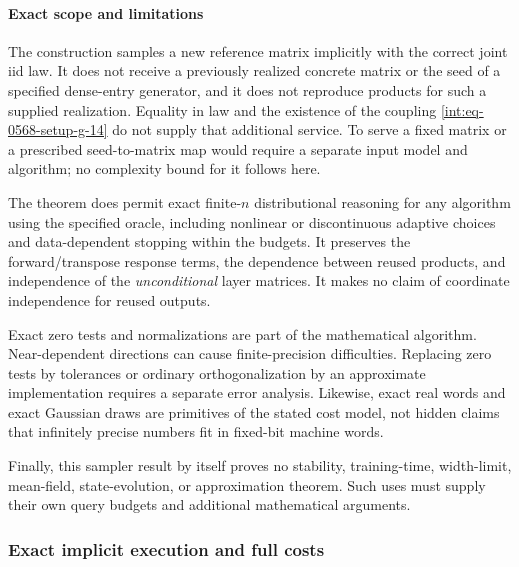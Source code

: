 \paragraph{Exact scope and limitations}
\label{int:setup-sampler-7}
\mbox{}\par\smallskip


The construction samples a new reference matrix implicitly with the correct joint iid law. It does not receive a previously realized concrete matrix or the seed of a specified dense-entry generator, and it does not reproduce products for such a supplied realization. Equality in law and the existence of the coupling \hyperref[int:eq-setup-g-14]{\eqref{int:eq-0568-setup-g-14}} do not supply that additional service. To serve a fixed matrix or a prescribed seed-to-matrix map would require a separate input model and algorithm; no complexity bound for it follows here.



The theorem does permit exact finite-\(n\) distributional reasoning for any algorithm using the specified oracle, including nonlinear or discontinuous adaptive choices and data-dependent stopping within the budgets. It preserves the forward/transpose response terms, the dependence between reused products, and independence of the \emph{unconditional} layer matrices. It makes no claim of coordinate independence for reused outputs.



Exact zero tests and normalizations are part of the mathematical algorithm. Near-dependent directions can cause finite-precision difficulties. Replacing zero tests by tolerances or ordinary orthogonalization by an approximate implementation requires a separate error analysis. Likewise, exact real words and exact Gaussian draws are primitives of the stated cost model, not hidden claims that infinitely precise numbers fit in fixed-bit machine words.



Finally, this sampler result by itself proves no stability, training-time, width-limit, mean-field, state-evolution, or approximation theorem. Such uses must supply their own query budgets and additional mathematical arguments.


\subsubsection{Exact implicit execution and full costs}
\label{int:setup-implicit}


